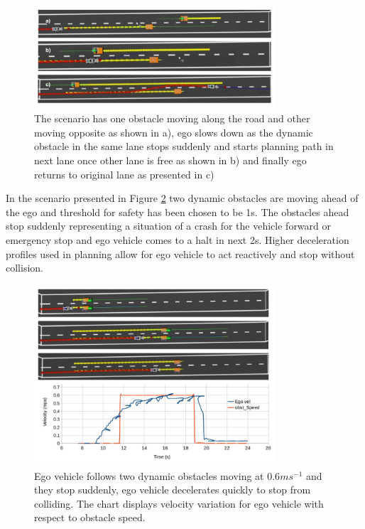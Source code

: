 \fi
\begin{figure}
    \centering
    \includegraphics[width=0.8\textwidth]{Images/evaluation/sudden_Stop_dyn_1.jpg}
    \caption{The scenario has one obstacle moving along the road and other moving opposite as shown in a), ego slows down as the dynamic obstacle in the same lane stops suddenly and starts planning path in next lane once other lane is free as shown in b) and finally ego returns to original lane as presented in c) }
    \label{dynamic_1}
\end{figure}

In the scenario presented in Figure \ref{dynamic_2} two dynamic obstacles are moving ahead of the ego and threshold for safety has been chosen to be 1s. The obstacles ahead stop suddenly representing a situation of a crash for the vehicle forward or emergency stop and ego vehicle comes to a halt in next 2s. Higher deceleration profiles used in planning allow for ego vehicle to act reactively and stop without collision. 

\begin{figure}
	\centering
	\includegraphics[width=0.8\textwidth]{Images/evaluation/sudden_stopping_lane_blocked_2.jpg}
	\caption{Ego vehicle follows two dynamic obstacles moving at $0.6ms^{-1}$ and they stop suddenly, ego vehicle decelerates quickly to stop from colliding. The chart displays velocity variation for ego vehicle with respect to obstacle speed.}
	\label{dynamic_2}
\end{figure}



